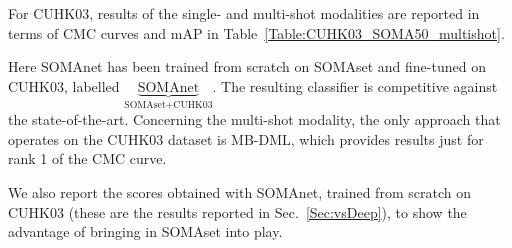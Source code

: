 \documentclass[10pt,journal,letterpaper,compsoc]{IEEEtran}
\newcommand{\ts}[2]{$\underbrace{\text{#1}}_\text{#2}$}
\begin{document}
For CUHK03, results of the single- and multi-shot modalities are reported in terms of CMC curves and mAP in Table~\ref{Table:CUHK03_SOMA50_multishot}.

Here SOMAnet has been trained from scratch on SOMAset and fine-tuned on CUHK03, labelled
\ts{SOMAnet}{SOMAset+CUHK03}. The resulting classifier is competitive against the state-of-the-art. Concerning the multi-shot modality, the only approach that operates on the CUHK03 dataset is MB-DML, which provides    results just for rank 1 of the CMC curve.

We also report the scores obtained with SOMAnet, trained from scratch on CUHK03 (these are the results reported in Sec.~\ref{Sec:vsDeep}), to show the advantage of bringing in SOMAset into play. 

\end{document}
